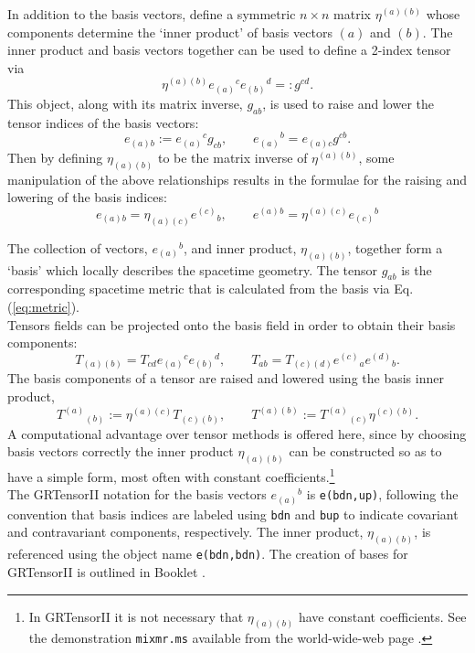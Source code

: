 \documentclass{article}
\begin{document}
In addition to the basis vectors, define a symmetric $n\times n$
matrix $\eta^{(a)(b)}$ whose components determine the `inner
product' of basis vectors $(a)$ and $(b)$. The inner product and basis
vectors together can be used to define a 2-index tensor via
\begin{equation}
  \eta^{(a)(b)} e_{(a)}{}^c e_{(b)}{}^d =: g^{cd}.
  \label{eq:metric}
\end{equation}
This object, along with its matrix inverse, $g_{ab}$, is used to raise
and lower the tensor indices of the basis vectors:
\[
  e_{(a)b} := e_{(a)}{}^c g_{cb}, \qquad e_{(a)}{}^b = e_{(a)c} g^{cb}.
\]
Then by defining $\eta_{(a)(b)}$ to be the matrix inverse of
$\eta^{(a)(b)}$, some manipulation of the above relationships results
in the formulae for the raising and lowering of the basis indices:
\[
  e_{(a)b} = \eta_{(a)(c)} e^{(c)}{}_b, \qquad e^{(a)}{}^b =
  \eta^{(a)(c)} e_{(c)}{}^b
\] 

The collection of vectors, $e_{(a)}{}^b$, and inner product,
$\eta_{(a)(b)}$, together form a `basis' which locally describes the
spacetime geometry. The tensor $g_{ab}$ is the corresponding spacetime
metric that is calculated from the basis via Eq. (\ref{eq:metric}).\\

Tensors fields can be projected onto the basis field in order to
obtain their basis components:
\[
  T_{(a)(b)} = T_{cd} e_{(a)}{}^c e_{(b)}{}^d, \qquad
  T_{ab} = T_{(c)(d)} e^{(c)}{}_a e^{(d)}{}_b.
\]
The basis components of a tensor are raised and lowered
using the basis inner product,
\[
  T^{(a)}{}_{(b)} := \eta^{(a)(c)} T_{(c)(b)}, \qquad T^{(a)(b)} :=
  T^{(a)}{}_{(c)} \eta^{(c)(b)}.
\]
A computational advantage over tensor methods is offered here, since
by choosing basis vectors correctly the inner product $\eta_{(a)(b)}$
can be constructed so as to have a simple form, most often with
constant coefficients.\footnote{In GRTensorII it is not necessary that
$\eta_{(a)(b)}$ have constant coefficients. See the demonstration
\texttt{mixmr.ms} available from the world-wide-web page
\cite{www}.}\\

The GRTensorII notation for the basis vectors $e_{(a)}{}^b$ is
\texttt{e(bdn,up)}, following the convention that basis indices are
labeled using \texttt{bdn} and \texttt{bup} to indicate covariant and
contravariant components, respectively. The inner product,
$\eta_{(a)(b)}$, is referenced using the object name
\texttt{e(bdn,bdn)}. The creation of bases for GRTensorII is outlined
in Booklet \grMakegRef.\\
\end{document}
